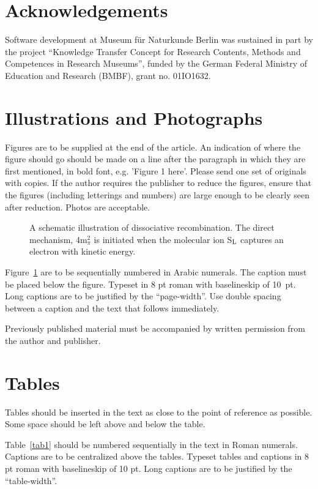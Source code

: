 \documentclass{IJCS_template}
\begin{document}
{\section{Acknowledgements}
Software development at Museum für Naturkunde Berlin was sustained in part by the project ``Knowledge Transfer Concept for Research Contents, Methods and Competences in Research Museums'', funded by the German Federal Ministry of Education and Research (BMBF), grant no. 01IO1632.





\section{Illustrations and Photographs}
Figures are to be supplied at the end of the article. An indication
of where the figure should go should be made on a line after the
paragraph in which they are first mentioned, in bold font, e.g.
'Figure 1 here'.  Please send one set of originals with copies. If
the author requires the publisher to reduce the figures, ensure that
the figures (including letterings and numbers) are large enough to
be clearly seen after reduction. Photos are acceptable.

\begin{figure}[th]
\centerline{}
\vspace*{8pt}
\caption{A schematic illustration of dissociative recombination. The
direct mechanism, 4m$^2_\pi$ is initiated when the molecular ion
S$_{\rm L}$ captures an electron with kinetic energy.\label{one}}
\end{figure}

Figure~\ref{one} are to be sequentially numbered in Arabic
numerals. The caption must be placed below the figure. Typeset in 8 pt
roman with baselineskip of 10~pt. Long captions are to be justified by
the ``page-width''.  Use double spacing between a caption and the text
that follows immediately.

Previously published material must be accompanied by written
permission from the author and publisher.

\section{Tables}
Tables should be inserted in the text as close to the point of
reference as possible. Some space should be left above and below
the table.

Table~\ref{tab1} should be numbered sequentially in the text in
Roman numerals. Captions are to be centralized above the tables.
Typeset tables and captions in 8 pt roman with baselineskip of 10
pt. Long captions are to be justified by the ``table-width''.

}
\end{document}
